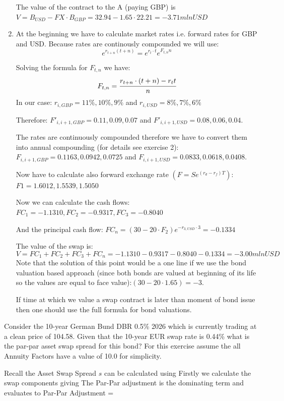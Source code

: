 \documentclass[12pt,a4paper]{exam}
\begin{document}
\begin{questions}
\begin{solution}
\begin{enumerate}[label=(\alph*),font=\itshape]
The value of the contract to the A (paying GBP) is $V=B_{USD}-FX\cdot B_{GBP}=32.94-1.65\cdot22.21=-3.71 mln USD$
\item At the beginning we have to calculate market rates i.e. forward rates for GBP and USD. Because rates are continously compounded we will use:
\begin{equation*}
e^{r_{t+n}(t+n)}=e^{r_t\cdot t}e^{F_{t, n}n}
\end{equation*}

Solving the formula for $F_{t, n}$ we have:
\begin{equation*}
F_{t, n}=\cfrac{r_{t+n}\cdot(t+n)-r_t t}{n}
\end{equation*}
In our case:
$r_{i,GBP}=11\%,10\%,9\%$ and $r_{i,USD}=8\%,7\%,6\%$

Therefore:
$F'_{i,i+1,GBP} = 0.11,0.09,0.07$ and $F'_{i,i+1,USD} = 0.08,0.06,0.04$.

The rates are continuously compounded therefore we have to convert them into annual compounding (for details see exercise 2):
$F_{i,i+1,GBP}=0.1163,0.0942,0.0725$ and $F_{i, i+1,USD}=0.0833,0.0618,0.0408$.

Now have to calculate also forward exchange rate $(F=Se^{(r_d-r_f)T})$:
$F1=1.6012,1.5539,1.5050$

Now we can calculate the cash flows:
$FC_1=-1.1310, FC_2=-0.9317, FC_3=-0.8040$

And the principal cash flow:
$FC_n=(30-20\cdot F_2)e^{-r_{3,USD}\cdot 3} = -0.1334$

The value of the swap is:
\begin{equation*}
V=FC_1+FC_2+FC_3+FC_n=-1.1310-0.9317-0.8040-0.1334=-3.00 mlnUSD
\end{equation*}
Note that the solution of this point would be a one line if we use the bond valuation based approach (since both bonds are valued at beginning of its life so the values are equal to face value):$(30-20\cdot 1.65)=-3$.

If time at which we value a swap contract is later than moment of bond issue then one should use the full formula for bond valuations.
\end{enumerate}
\end{solution}

\question Consider the 10-year German Bund DBR 0.5\% 2026 which is currently trading at a clean price of 104.58. 
Given that the 10-year EUR swap rate is 0.44\% what is the par-par asset swap spread for this bond? 
For this exercise assume the all Annuity Factors have a value of 10.0 for simplicity.
\begin{solution}
Recall the Asset Swap Spread $s$ can be calculated using 
Firstly we calculate the swap components giving 
The Par-Par adjustment is the dominating term and evaluates to
Par-Par Adjustment =


\end{solution}
\end{questions}
\end{document}
